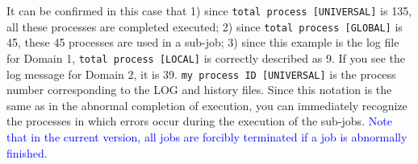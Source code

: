 It can be confirmed in this case that 1) since \verb|total process [UNIVERSAL]| is 135, all these processes are completed executed; 2) since \verb|total process [GLOBAL]| is 45, these 45 processes are used in a sub-job; 3) since this example is the log file for Domain 1,  \verb|total process [LOCAL]| is correctly described as 9. If you see the log message for Domain 2,  it is 39. \verb|my process ID [UNIVERSAL]|  is the process number  corresponding to the LOG and history files. Since this notation is the same as in the abnormal completion of execution, you can immediately recognize the processes in which errors occur during the execution of the sub-jobs. \textcolor{blue}{Note that in the current version, all jobs are forcibly terminated if a job is abnormally finished.}



